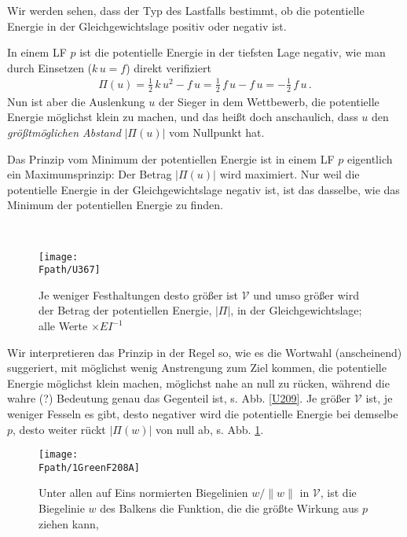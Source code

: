 {{{{{Wir werden sehen, dass der Typ des Lastfalls bestimmt, ob die potentielle Energie in der Gleichgewichtslage positiv oder negativ ist.

In einem LF $p$ ist die potentielle Energie in der tiefsten Lage negativ, wie man durch Einsetzen ($ k\,u = f$) direkt verifiziert
\begin{align}
\Pi(u) = \frac{1}{2}\,k\,u^2 - f\,u = \frac{1}{2}\, f\,u - f\,u = - \frac{1}{2}\, f\,u\,.
\end{align}
Nun ist aber die Auslenkung $ u $ der Sieger in dem Wettbewerb, die potentielle Energie m\"{o}glichst klein zu machen, und das hei{\ss}t doch anschaulich, dass $ u $ den {\em gr\"{o}{\ss}tm\"{o}glichen Abstand\/} $|\Pi(u)|$ vom Nullpunkt hat.\\

\hspace*{-12pt}\colorbox{highlightBlue}{\parbox{0.98\textwidth}{Das Prinzip vom Minimum der potentiellen Energie ist in einem LF $p$ eigentlich ein Maximumsprinzip: Der Betrag $|\Pi(u)|$ wird maximiert. Nur weil die potentielle Energie in der Gleichgewichtslage negativ ist, ist das dasselbe, wie das Minimum der potentiellen Energie zu finden.}}
\\

\begin{figure}[tbp]
\centering
\if {} \sidecaption \fi
\texttt{[image: \\Fpath/U367]}
\caption{Je weniger Festhaltungen desto gr\"{o}{\ss}er ist $\mathcal{V}$ und umso gr\"{o}{\ss}er wird der Betrag der potentiellen Energie, $|\Pi|$, in der Gleichgewichtslage; alle Werte $\times EI^{-1}$}
\label{U367}
\end{figure}%

Wir interpretieren das Prinzip in der Regel so, wie es die Wortwahl (anscheinend)  suggeriert, mit m\"{o}glichst wenig Anstrengung zum Ziel kommen, die potentielle Energie m\"{o}glichst klein machen, m\"{o}glichst nahe an null zu r\"{u}cken, w\"{a}hrend die wahre (?) Bedeutung genau das Gegenteil ist, s. Abb. \ref{U209}. Je gr\"{o}{\ss}er $\mathcal{V}$ ist, je weniger Fesseln es gibt, desto negativer wird die potentielle Energie bei demselbe $p$, desto weiter r\"{u}ckt $|\Pi(w)|$ von null ab, s. Abb. \ref{U367}.
\begin{figure}[tbp]
\centering
\if {} \sidecaption \fi
\texttt{[image: \\Fpath/1GreenF208A]}
\caption{Unter allen auf Eins normierten Biegelinien $w/\|w\|$ in $\mathcal{V}$, ist die Biegelinie $w$ des Balkens die Funktion, die die gr\"{o}{\ss}te Wirkung aus $p$ ziehen kann, \cite{Ha6} }
\label{Supremum}
\end{figure}%


}}}}}
